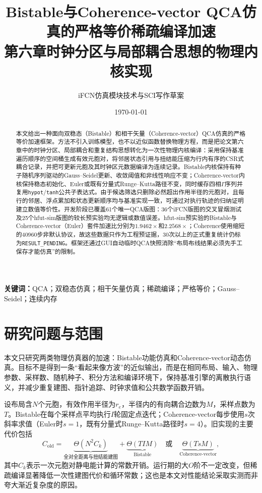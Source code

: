 \documentclass[UTF8,a4paper,11pt]{ctexart}
\title{Bistable与Coherence-vector QCA仿真的严格等价稀疏编译加速\\
\large 第六章时钟分区与局部耦合思想的物理内核实现}
\author{iFCN仿真模块技术与SCI写作草案}
\date{\today}
\newcommand{\pending}{\texttt{RESULT\_PENDING}}
\newcommand{\csr}{\textsc{CSR}}
\begin{document}
\maketitle

\begin{abstract}
本文给出一种面向双稳态（Bistable）和相干矢量（Coherence-vector）QCA仿真的严格等价加速框架。方法不引入训练模型，也不以近似函数替换物理方程，而是把论文第六章中的时钟分区、局部耦合和重复结构思想转化为一次性物理内核编译：采用保持基准遍历顺序的空间桶生成有效元胞对，将邻居状态引用与扭结能压缩为行内有序的\csr{}式耦合记录，并把可更新元胞及其时钟区元数据编译为连续记录。Bistable内核保持有种子随机序列驱动的Gauss--Seidel更新、收敛阈值和非线性响应不变；Coherence-vector内核保持稳态初始化、Euler或既有分量式Runge--Kutta路径不变，同时缓存四相$\Gamma$序列并复用\texttt{hypot}/\texttt{tanh}公共子表达式。由于候选筛选只删除必然超出作用半径的元胞对，且每行的邻居、浮点累加和状态更新顺序均与基准实现一致，可通过对执行轨迹的归纳证明建立数值等价性。开发阶段已覆盖61个唯一QCA版图：36个iFCN版图的交叉冒烟测试及25个hfut-sim版图的较长预实验均无逻辑或数值误差。hfut-sim预实验的Bistable与Coherence-vector（Euler）套件加速比分别为$1.9462\times$和$2.2568\times$；Coherence使用缩短的40960步非默认协议，故这些数据只作为工程预证据，30次以上的正式重复统计仍标为\pending。框架还通过GUI自动临时QCA快照消除“布局布线结果必须先手工保存才能仿真”的限制。
\end{abstract}

\noindent\textbf{关键词：}QCA；双稳态仿真；相干矢量仿真；稀疏编译；严格等价；Gauss--Seidel；连续内存

\section{研究问题与范围}

本文只研究两类物理仿真器的加速：Bistable功能仿真和Coherence-vector动态仿真。目标不是得到一条“看起来像方波”的近似输出，而是在相同布局、输入、物理参数、采样数、随机种子、积分方法和编译环境下，保持基准引擎的离散执行语义，并减少重复建图、指针追踪、时钟求值和公共数学函数开销。

设布局含$N$个元胞，有效作用半径为$r_e$，半径内的有向耦合边数为$M$，采样点数为$T$。Bistable在每个采样点平均执行$I$轮固定点迭代；Coherence-vector每步使用$s$次斜率求值（Euler时$s=1$，既有分量式Runge--Kutta路径时$s=4$）。旧实现的主要代价包括
\begin{equation}
  C_{\mathrm{old}}
  =\underbrace{\Theta(N^2 C_k)}_{\text{全对全距离与扭结能建图}}
  +\underbrace{\Theta(TIM)}_{\text{Bistable}}
  \quad\text{或}\quad
  \underbrace{\Theta(TsM)}_{\text{Coherence-vector}},
\end{equation}
其中$C_k$表示一次元胞对静电能计算的常数开销。运行期的大$O$阶不一定改变，但稀疏编译显著降低一次性建图代价和循环常数；这也是本文对性能结论采取实测而非夸大渐近复杂度的原因。
\end{document}
